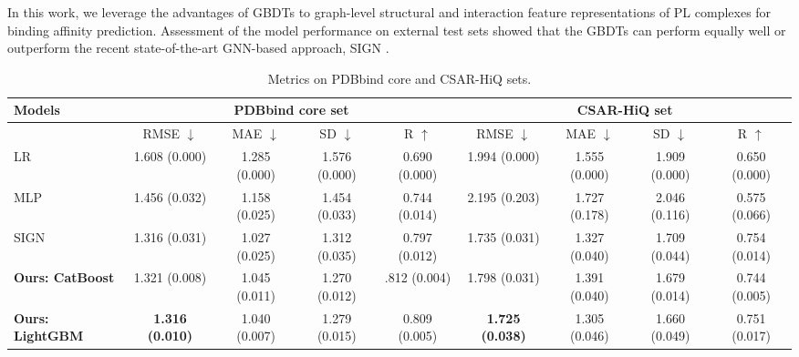 \documentclass[nohyperref]{article}
\theoremstyle{plain}
\theoremstyle{definition}
\theoremstyle{remark}
\begin{document}
In this work, we leverage the advantages of GBDTs to graph-level structural and interaction feature representations of PL complexes for binding affinity prediction. Assessment of the model performance on external test sets showed that the GBDTs can perform equally well or outperform the recent state-of-the-art GNN-based approach, SIGN \cite{sign}.
\begin{table*}[t]
    \caption{Metrics on PDBbind core and CSAR-HiQ sets.}
    \label{tab:metrics}
    \footnotesize
    \centering
    \begin{tabular}{@{}lcccccccc@{}}
        \toprule
        \multirow{2}{*}[-1em]{Models} & \multicolumn{4}{c|}{PDBbind core set} & \multicolumn{4}{c}{CSAR-HiQ set}\\
\midrule
        {} & RMSE $\downarrow$ & MAE $\downarrow$ & SD $\downarrow$ & R $\uparrow$ & RMSE $\downarrow$ & MAE $\downarrow$ & SD $\downarrow$ & R $\uparrow$\\
        \midrule
        LR & 1.608 (0.000) & 1.285 (0.000) & 1.576 (0.000) & 0.690 (0.000) & 1.994 (0.000) & 1.555 (0.000) & 1.909 (0.000) & 0.650 (0.000) \\
        
        MLP & 1.456 (0.032) & 1.158 (0.025) & 1.454 (0.033) & 0.744 (0.014) & 2.195 (0.203) & 1.727 (0.178) & 2.046 (0.116) & 0.575 (0.066) \\

        SIGN & 1.316 (0.031) & 1.027 (0.025) &  1.312 (0.035) & 0.797 (0.012) & 1.735 (0.031) & 1.327 (0.040) & 1.709 (0.044) & 0.754 (0.014) \\
        \hline
        \textbf{Ours: CatBoost} & 1.321 (0.008) & 1.045 (0.011) & 1.270 (0.012) & .812 (0.004) & 1.798 (0.031) & 1.391 (0.040) & 1.679 (0.014) & 0.744 (0.005) \\
        
        \textbf{Ours: LightGBM} & \textbf{1.316 (0.010)} & 1.040 (0.007) & 1.279 (0.015) & 0.809 (0.005) & \textbf{1.725 (0.038)} & 1.305 (0.046) & 1.660 (0.049) & 0.751 (0.017) \\
        \bottomrule
    \end{tabular}
\end{table*}
\end{document}
